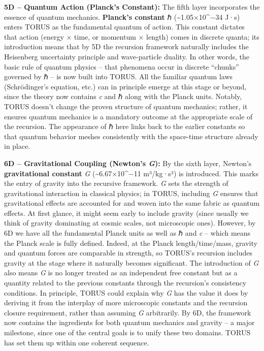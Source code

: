 \documentclass[
]{article}
\begin{document}
\textbf{5D -- Quantum Action (Planck's Constant):} The fifth layer
incorporates the essence of quantum mechanics. \textbf{Planck's
constant} ℏ (\textasciitilde1.05×10\^{}−34 J·s) enters TORUS as the
fundamental quantum of action. This constant dictates that action
(energy × time, or momentum × length) comes in discrete quanta; its
introduction means that by 5D the recursion framework naturally includes
the Heisenberg uncertainty principle and wave-particle duality. In other
words, the basic rule of quantum physics -- that phenomena occur in
discrete ``chunks'' governed by ℏ -- is now built into TORUS. All the
familiar quantum laws (Schrödinger's equation, etc.) can in principle
emerge at this stage or beyond, since the theory now contains \emph{c}
and ℏ along with the Planck units. Notably, TORUS doesn't change the
proven structure of quantum mechanics; rather, it ensures quantum
mechanics is a mandatory outcome at the appropriate scale of the
recursion. The appearance of ℏ here links back to the earlier constants
so that quantum behavior meshes consistently with the space-time
structure already in place.

\textbf{6D -- Gravitational Coupling (Newton's \emph{G}):} By the sixth
layer, Newton's \textbf{gravitational constant} \emph{G}
(\textasciitilde6.67×10\^{}−11 m³/kg·s²) is introduced. This marks the
entry of gravity into the recursive framework. \emph{G} sets the
strength of gravitational interaction in classical physics; in TORUS,
including \emph{G} ensures that gravitational effects are accounted for
and woven into the same fabric as quantum effects. At first glance, it
might seem early to include gravity (since usually we think of gravity
dominating at cosmic scales, not microscopic ones). However, by 6D we
have all the fundamental Planck units as well as ℏ and \emph{c} -- which
means the Planck scale is fully defined. Indeed, at the Planck
length/time/mass, gravity and quantum forces are comparable in strength,
so TORUS's recursion includes gravity at the stage where it naturally
becomes significant. The introduction of \emph{G} also means \emph{G} is
no longer treated as an independent free constant but as a quantity
related to the previous constants through the recursion's consistency
conditions. In principle, TORUS could explain why \emph{G} has the value
it does by deriving it from the interplay of more microscopic constants
and the recursion closure requirement, rather than assuming \emph{G}
arbitrarily. By 6D, the framework now contains the ingredients for both
quantum mechanics and gravity -- a major milestone, since one of the
central goals is to unify these two domains. TORUS has set them up
within one coherent sequence.
\end{document}
